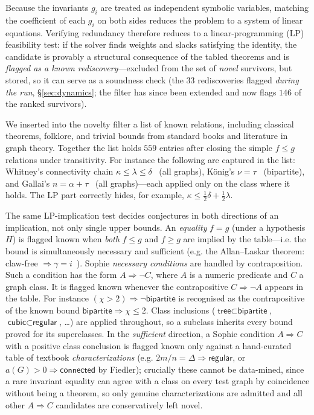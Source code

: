 \documentclass[]{ceurart}
\begin{document}
    Because the invariants $g_i$ are treated as independent symbolic variables, matching the coefficient of each $g_i$ on both sides reduces the problem to a system of linear equations. Verifying redundancy therefore reduces to a linear-programming (LP) feasibility test: if the solver finds weights and
  slacks satisfying the identity, the candidate is provably a structural consequence of the tabled theorems and is \emph{flagged as a known rediscovery}---excluded from the set of \emph{novel} survivors, but stored, so it can serve as a soundness check (the $33$ rediscoveries flagged \emph{during the run}, \S\ref{sec:dynamics}; the
  filter has since been extended and now flags $146$ of the ranked survivors).

We inserted into the novelty filter a list of known relations, including classical theorems, folklore, and trivial bounds from standard books and literature in graph theory. Together the list holds $559$ entries after closing the simple $f\le g$
relations under transitivity. For instance the following are captured in the list: Whitney's connectivity chain $\kappa\le\lambda\le\delta$~\cite{whitney1932congruent}
(all graphs), K\"onig's $\nu=\tau$~\cite{konig1931graphen} (bipartite), and
Gallai's $n=\alpha+\tau$~\cite{gallai1959uber} (all graphs)---each applied only on the class where
it holds. The LP part correctly hides, for
example, $\kappa\le\tfrac12\delta+\tfrac12\lambda$.

The same LP-implication test decides conjectures in both directions of an
implication, not only single upper bounds. An \emph{equality} $f=g$ (under a
hypothesis $H$) is flagged known when \emph{both} $f\le g$ and $f\ge g$ are
implied by the table---i.e. the bound is simultaneously necessary and
sufficient (e.g. the Allan--Laskar theorem: claw-free $\Rightarrow \gamma=i$~\cite{allan1978domination}). Sophie \emph{necessary conditions} are handled by contraposition. Such a
condition has the form $A\Rightarrow\neg C$, where $A$ is a numeric predicate
and $C$ a graph class. It is flagged known whenever the contrapositive
$C\Rightarrow\neg A$ appears in the table. For instance
$(\chi>2)\Rightarrow\neg\textsf{bipartite}$ is recognised as the
contrapositive of the known bound $\textsf{bipartite}\Rightarrow\chi\le2$.
Class inclusions ($\textsf{tree}\subset\textsf{bipartite}$,
$\textsf{cubic}\subset\textsf{regular}$, \dots) are applied throughout, so a
subclass inherits every bound proved for its superclasses. In the \emph{sufficient} direction, a Sophie condition
$A\Rightarrow C$ with a positive class conclusion is flagged known only against
a hand-curated table of textbook \emph{characterizations} (e.g. $2m/n=\Delta
\Rightarrow \textsf{regular}$, or $a(G)>0\Rightarrow\textsf{connected}$ by
Fiedler); crucially these cannot be data-mined, since a rare invariant equality
can agree with a class on every test graph by coincidence without being a
theorem, so only genuine characterizations are admitted and all other
$A\Rightarrow C$ candidates are conservatively left novel.
\end{document}
